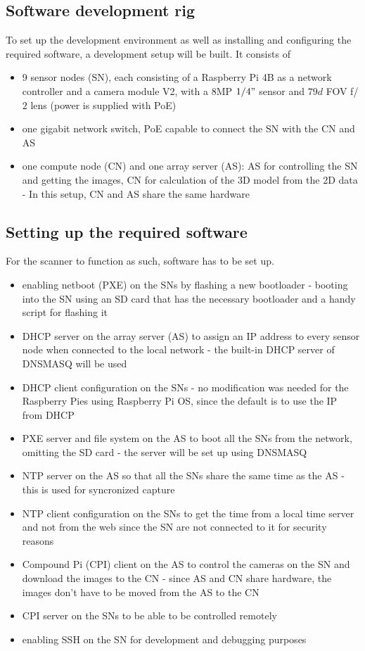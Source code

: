 \subsection{Software development rig}
	To set up the development environment as well as installing and configuring the required software, a development setup will be built. It consists of
	\begin{itemize}
		\item 9 sensor nodes (SN), each consisting of a Raspberry Pi 4B as a network controller and a camera module V2, with a $8$MP $1/4"$ sensor and $79d$ FOV f/$2$ lens (power is supplied with PoE)
		\item one gigabit network switch, PoE capable to connect the SN with the CN and AS
		\item one compute node (CN) and one array server (AS): AS for controlling the SN and getting the images, CN for calculation of the 3D model from the 2D data - In this setup, CN and AS share the same hardware
	\end{itemize}
	
\subsection{Setting up the required software}
	For the scanner to function as such, software has to be set up.
	\begin{itemize}
		\item enabling netboot (PXE) on the SNs by flashing a new bootloader - booting into the SN using an SD card that has the necessary bootloader and a handy script for flashing it
		\item DHCP server on the array server (AS) to assign an IP address to every sensor node when connected to the local network - the built-in DHCP server of DNSMASQ will be used
		\item DHCP client configuration on the SNs - no modification was needed for the Raspberry Pies using Raspberry Pi OS, since the default is to use the IP from DHCP
		\item PXE server and file system on the AS to boot all the SNs from the network, omitting the SD card - the server will be set up using DNSMASQ
		\item NTP server on the AS so that all the SNs share the same time as the AS - this is used for syncronized capture
		\item NTP client configuration on the SNs to get the time from a local time server and not from the web since the SN are not connected to it for security reasons
		\item Compound Pi (CPI) client on the AS to control the cameras on the SN and download the images to the CN - since AS and CN share hardware, the images don't have to be moved from the AS to the CN
		\item CPI server on the SNs to be able to be controlled remotely
		\item enabling SSH on the SN for development and debugging purposes
	\end{itemize}
	
